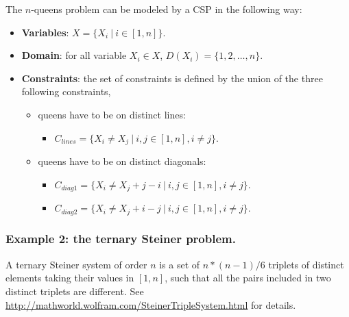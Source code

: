 The $n$-queens problem can be modeled by a CSP in the following way:
\begin{itemize}
	\item \textbf{Variables}: $X = \{X_{i}\ |\ i\in [1,n]\}$.
	\item \textbf{Domain}: for all variable $X_{i}\in X$, $D(X_{i}) = \{1,2,\ldots, n\}$.
	\item \textbf{Constraints}: the set of constraints is defined by the union of the three following constraints,
	\begin{itemize}
		\item queens have to be on distinct lines:
		\begin{itemize}
			\item $C_{lines} = \{X_{i}\neq X_{j}\ |\ i,j\in [1,n], i\neq j\}$.
		\end{itemize}
		\item queens have to be on distinct diagonals:
		\begin{itemize}
			\item $C_{diag1} = \{X_{i}\neq X_{j}+j-i\ |\ i,j\in [1,n], i\neq j\}$.
			\item $C_{diag2} = \{X_{i}\neq X_{j}+i-j\ |\ i,j\in [1,n], i\neq j\}$.
		\end{itemize}
	\end{itemize}
\end{itemize}

\subsubsection{Example 2: the ternary Steiner problem.}\label{introduction:example2:theternarysteinerproblem}\hypertarget{introduction:example2:theternarysteinerproblem}{}
A ternary Steiner system of order $n$ is a set of $n*(n-1)/6$ triplets of distinct elements taking their values in $[1,n]$, such that all the pairs included in two distinct triplets are different.
See \url{http://mathworld.wolfram.com/SteinerTripleSystem.html} for details. 

